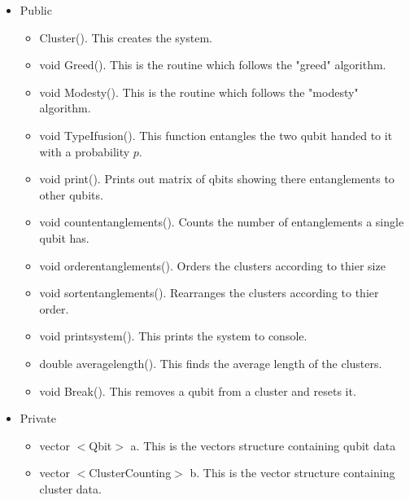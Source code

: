 \documentclass{article}
\numberwithin{equation}{section} %
\begin{document}
\begin{itemize}
\item Public
\begin{itemize}
\item Cluster(). This creates the system.
\item void Greed(). This is the routine which follows the "greed" algorithm.
\item void Modesty(). This is the routine which follows the "modesty" algorithm.
\item void TypeIfusion(). This function entangles the two qubit handed to it with a probability $p$.
\item void print(). Prints out matrix of qbits showing there entanglements to other qubits.
\item void count\textunderscore entanglements(). Counts the number of entanglements a single qubit has.
\item void order\textunderscore entanglements(). Orders the clusters according to thier size
\item void sort\textunderscore entanglements(). Rearranges the clusters according to thier order.
\item void print\textunderscore system(). This prints the system to console.
\item double average\textunderscore length(). This finds the average length of the clusters. 
\item void Break(). This removes a qubit from a cluster and resets it.

	
\end{itemize}

\item Private
\begin{itemize}

\item vector $<$Qbit$>$ a. This is the vectors structure containing qubit data
\item vector $<$ClusterCounting$>$ b. This is the vector structure containing cluster data.

\end{itemize}

\end{itemize}
\end{document}

